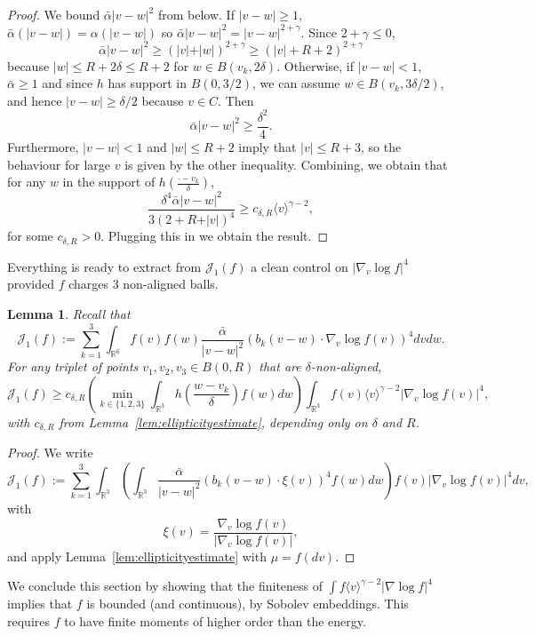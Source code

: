 \documentclass[11pt,a4paper]{article}
\theoremstyle{definition}
\theoremstyle{plain}
\newtheorem{lemma}[defi]{Lemma}
\newcommand{\jap}[1]{\langle #1 \rangle}
\begin{document}
\begin{proof}
    We bound $\bar{\alpha}\vert v - w\vert^2$ from below. If $\vert v-w\vert \geq 1$, $\bar{\alpha}(\vert v-w\vert)=\alpha(\vert v-w\vert)$ so $\bar{\alpha}\vert v - w\vert^2=\vert v - w\vert^{2+\gamma}$. Since $2+\gamma\leq 0$,
    $$\bar{\alpha}\vert v - w\vert^2\geq ( \vert v\vert + \vert  w\vert )^{2+\gamma}\geq ( \vert v\vert + R + 2 )^{2+\gamma}$$
    because $\vert w\vert \leq R+2\delta \leq R+2$ for $w\in B(v_k,2\delta)$. Otherwise, if $\vert v-w\vert < 1$, $\bar{\alpha}\geq 1$ and since $h$ has support in $B(0,3/2)$, we can assume $w\in B(v_k,3\delta/2)$, and hence $\vert v-w\vert \geq \delta/2$ because $v\in C$. Then
    $$\bar{\alpha}\vert v - w\vert^2 \geq \frac{\delta^2}{4}. $$
    Furthermore, $\vert v-w\vert < 1$ and $\vert w \vert \leq R+2$ imply that $\vert v\vert\leq R+3$, so the behaviour for large $v$ is given by the other inequality.
    Combining, we obtain that for any $w$ in the support of $h\left(\frac{\cdot-v_k}{\delta}\right)$,
    $$\frac{\delta^4\bar{\alpha}\vert v - w\vert^2} {3(2+R+\vert v\vert)^4}\geq c_{\delta,R} \jap{v}^{\gamma-2},$$
    for some $c_{\delta,R}>0$. Plugging this in we obtain the result.
\end{proof}
Everything is ready to extract from $\mathcal{J}_1(f)$ a clean control on $\vert \nabla_v \log f\vert^4$ provided $f$ charges 3 non-aligned balls.
\begin{lemma}
    \label{lem:J_1controlsFisher4}
    Recall that $$\mathcal{J}_1(f):=\sum_{k=1}^3\int_{\mathbb{R}^{6}}f(v)f(w)  \frac{\bar{\alpha}}{\vert v - w\vert^2} \left( b_k(v-w)\cdot \nabla_v\log f(v) \right)^4 dvdw.$$
    For any triplet of points $v_1,v_2,v_3 \in B(0,R)$ that are $\delta$-non-aligned,
    $$\mathcal{J}_1(f) \geq c_{\delta,R}\left(\min_{k\in\{1,2,3\} }  \int_{\mathbb{R}^3}h\left(\frac{w-v_k}{\delta}\right)f(w)dw\right)\int_{\mathbb{R}^{3}} f(v) \jap{v}^{\gamma-2}\vert \nabla_v\log f(v)\vert^4,$$
    with $c_{\delta,R}$ from Lemma~\ref{lem:ellipticityestimate}, depending only on $\delta$ and $R$.
\end{lemma}
\begin{proof}
    We write $$\mathcal{J}_1(f):=\sum_{k=1}^3\int_{\mathbb{R}^{3}}\left(\int_{\mathbb{R}^{3}}  \frac{\bar{\alpha}}{\vert v - w\vert^2} \left( b_k(v-w)\cdot \xi(v) \right)^4 f(w)dw \right)f(v)\vert \nabla_v\log f(v) \vert^4 dv,$$
    with $$\xi(v)=\frac{\nabla_v\log f(v) }{\vert \nabla_v\log f(v)\vert},$$ and apply Lemma~\ref{lem:ellipticityestimate} with $\mu=f(dv)$.
\end{proof}
We conclude this section by showing that the finiteness of $\int f\jap{v}^{\gamma-2}\vert \nabla \log f\vert^4$ implies that $f$ is bounded (and continuous), by Sobolev embeddings. This requires $f$ to have finite moments of higher order than the energy.
\end{document}

